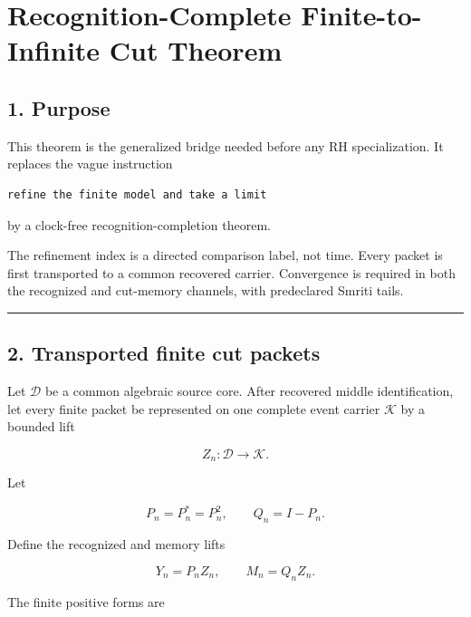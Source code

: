\hypertarget{recognition-complete-finite-to-infinite-cut-theorem}{%
\chapter{Recognition-Complete Finite-to-Infinite Cut Theorem}\label{recognition-complete-finite-to-infinite-cut-theorem}}

\hypertarget{purpose}{%
\section{1. Purpose}\label{purpose}}

This theorem is the generalized bridge needed before any RH specialization.
It replaces the vague instruction

\begin{verbatim}
refine the finite model and take a limit
\end{verbatim}

by a clock-free recognition-completion theorem.

The refinement index is a directed comparison label, not time. Every packet is
first transported to a common recovered carrier. Convergence is required in
both the recognized and cut-memory channels, with predeclared Smriti tails.

\begin{center}\rule{0.5\linewidth}{0.5pt}\end{center}

\hypertarget{transported-finite-cut-packets}{%
\section{2. Transported finite cut packets}\label{transported-finite-cut-packets}}

Let \(\mathcal D\) be a common algebraic source core. After recovered middle
identification, let every finite packet be represented on one complete event
carrier \(\mathcal K\) by a bounded lift

\[
Z_n:\mathcal D\longrightarrow\mathcal K.
\]

Let

\[
P_n=P_n^*=P_n^2,
\qquad
Q_n=I-P_n.
\]

Define the recognized and memory lifts

\[
Y_n=P_nZ_n,
\qquad
M_n=Q_nZ_n.
\]

The finite positive forms are

